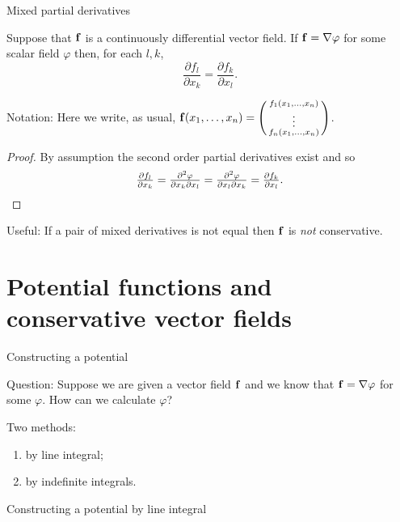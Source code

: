 {Mixed partial derivatives}

\begin{theorem}
    Suppose that \(\mathbf{f}\) is a continuously differential vector field.
    If \(\mathbf{f} = \nabla \varphi\) for some scalar field \(\varphi\) then, for each \(l,k\),
    \[
        \frac{\partial f_l}{\partial x_k} = \frac{\partial f_k}{\partial x_l}.
    \]
\end{theorem}

{Notation:} Here we write, as usual, \(\mathbf{f}(x_1,\ldots,x_n) = \left(\begin{smallmatrix}
        f_1(x_1,\ldots,x_n)\\
        \vdots \\
        f_n(x_1,\ldots,x_n)
    \end{smallmatrix}\right)\).

\begin{proof}
    By assumption the second order partial derivatives exist and so
    \[
        \tfrac{\partial f_l}{\partial x_k}
        = \tfrac{\partial^2 \varphi}{\partial x_k \partial x_l}
        = \tfrac{\partial^2 \varphi}{\partial x_l \partial x_k}
        = \tfrac{\partial f_k}{\partial x_l}. \qedhere
    \]
\end{proof}

{Useful:}
If a pair of mixed derivatives is not equal then \(\mathbf{f}\) is \emph{not} conservative.




\section{Potential functions and conservative vector fields}


 {Constructing a potential}

 {Question:}
Suppose we are given a vector field \(\mathbf{f}\) and we know that \(\mathbf{f} = \nabla \varphi\) for some \(\varphi\).
How can we calculate \(\varphi\)?

{Two methods:}
\begin{enumerate}
    \item by line integral;
    \item by indefinite integrals.
\end{enumerate}










{Constructing a potential by line integral}






